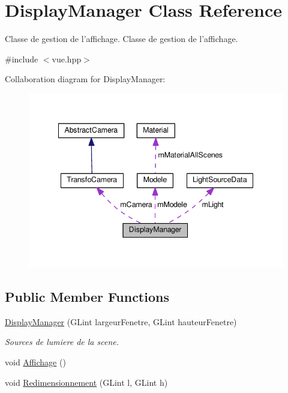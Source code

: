 \hypertarget{class_display_manager}{\section{Display\+Manager Class Reference}
\label{class_display_manager}
}


Classe de gestion de l'affichage. Classe de gestion de l'affichage.  




{\ttfamily \#include $<$vue.\+hpp$>$}



Collaboration diagram for Display\+Manager\+:
\nopagebreak
\begin{figure}[H]
\begin{center}
\leavevmode
\includegraphics[width=342pt]{class_display_manager__coll__graph}
\end{center}
\end{figure}
\subsection*{Public Member Functions}
\begin{DoxyCompactItemize}
\item 
\hyperlink{class_display_manager_abf11523503126b8ee8ed26d79aba9974}{Display\+Manager} (G\+Lint largeur\+Fenetre, G\+Lint hauteur\+Fenetre)
\begin{DoxyCompactList}\small\item\em Sources de lumiere de la scene. \end{DoxyCompactList}\item 
void \hyperlink{class_display_manager_a692eb24cc56a7ab15ab1fd5a88646a34}{Affichage} ()
\item 
void \hyperlink{class_display_manager_a5372587f56171ad81ac7c0ef686c61f4}{Redimensionnement} (G\+Lint l, G\+Lint h)
\end{DoxyCompactItemize}
